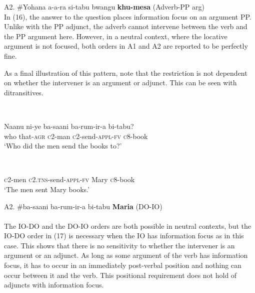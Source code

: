\gll A2.  \#Yohana   a-a-ra   si-tabu      bwangu   \textbf{khu-mesa}         (Adverb-PP arg)\\
In (16), the answer to the question places information focus on an argument PP. Unlike with the PP adjunct, the adverb cannot intervene between the verb and the PP argument here. However, in a neutral context, where the locative argument is not focused, both orders in A1 and A2 are reported to be perfectly fine.

  As a final illustration of this pattern, note that the restriction is not dependent on whether the intervener is an argument or adjunct. This can be seen with ditransitives. 

\begin{listWWviiiNumxlileveli}
\item \ea\label{ex:}
\\
\end{listWWviiiNumxlileveli}
\gll   Naanu    ni-ye    ba-saani   ba-rum-ir-a     bi-tabu?\\
     who     that-\textsc{agr}   \textsc{c}2-man   \textsc{c}2-send-\textsc{appl-fv}   \textsc{c}8-book\\
\glt ‘Who did the men send the books to?’
\z

\begin{listWWviiiNumxlileveli}
\end{listWWviiiNumxlileveli}
\begin{listWWviiiNumxlileveli}
\ea\label{ex:}
\\
\end{listWWviiiNumxlileveli}
       \textsc{c}2-men   \textsc{c2.tns}{}-send-\textsc{appl-fv}   Mary      \textsc{c}8-book  \\
\glt    ‘The men sent Mary books.’
\z

\gll A2.  \#ba-saani  ba-rum-ir-a      bi-tabu   \textbf{Maria}  (DO-IO) \\\\
The IO-DO and the DO-IO orders are both possible in neutral contexts, but the IO-DO order in (17) is necessary when the IO has information focus as in this case. This shows that there is no sensitivity to whether the intervener is an argument or an adjunct. As long as some argument of the verb has information focus, it has to occur in an immediately post-verbal position and nothing can occur between it and the verb. This positional requirement does not hold of adjuncts with information focus.

